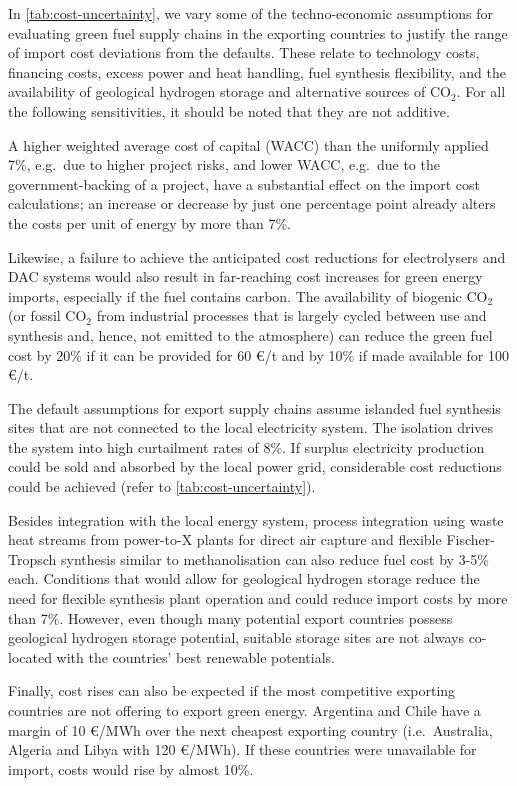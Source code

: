 In \cref{tab:cost-uncertainty}, we vary some of the techno-economic assumptions
for evaluating green fuel supply chains in the exporting countries to justify
the range of import cost deviations from the defaults. These relate to
technology costs, financing costs, excess power and heat handling, fuel
synthesis flexibility, and the availability of geological hydrogen storage and
alternative sources of CO$_2$. For all the following sensitivities, it should be
noted that they are not additive.

A higher weighted average cost of capital (WACC) than the uniformly applied 7\%,
e.g.~due to higher project risks, and lower WACC, e.g.~due to the
government-backing of a project, have a substantial effect on the import cost
calculations; an increase or decrease by just one percentage point already
alters the costs per unit of energy by more than
7\%.
 
Likewise, a failure to achieve the anticipated cost reductions for electrolysers
and DAC systems would also result in far-reaching cost increases for green
energy imports, especially if the fuel contains carbon. The availability of
biogenic CO$_2$ (or fossil CO$_2$ from industrial processes that is largely
cycled between use and synthesis and, hence, not emitted to the atmosphere) can
reduce the green fuel cost by 20\% if it can be provided for 60 \euro{}/t and by
10\% if made available for 100 \euro{}/t.

The default assumptions for export supply chains assume islanded fuel synthesis
sites that are not connected to the local electricity system. The isolation
drives the system into high curtailment rates of 8\%. If surplus electricity
production could be sold and absorbed by the local power grid, considerable cost
reductions could be achieved (refer to \cref{tab:cost-uncertainty}).

Besides integration with the local energy system, process integration using
waste heat streams from power-to-X plants for direct air capture and flexible
Fischer-Tropsch synthesis similar to methanolisation can also reduce fuel cost
by 3-5\% each. Conditions that would allow for geological hydrogen storage
reduce the need for flexible synthesis plant operation and could reduce import
costs by more than 7\%. However, even though many potential export countries
possess geological hydrogen storage potential, suitable storage sites are not
always co-located with the countries' best renewable potentials.

Finally, cost rises can also be expected if the most competitive exporting
countries are not offering to export green energy. Argentina and Chile have a
margin of 10 \euro{}/MWh over the next cheapest exporting country
(i.e.~Australia, Algeria and Libya with 120 \euro{}/MWh). If these countries
were unavailable for import, costs would rise by almost 10\%.

